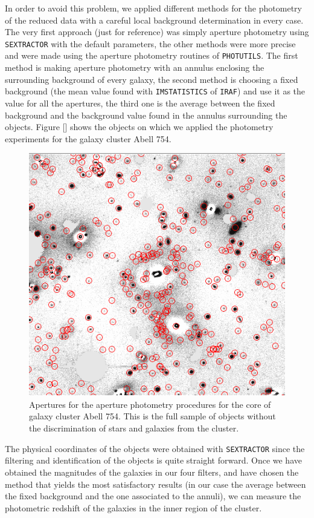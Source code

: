 In order to avoid this problem, we applied different methods for the photometry of the reduced data with a careful local background determination in every case. The very first approach (just for reference) was simply aperture photometry using \texttt{SEXTRACTOR} with the default parameters, the other methods were more precise and were made using the aperture photometry routines of \texttt{PHOTUTILS}. The first method is making aperture photometry with an annulus enclosing the surrounding background of every galaxy, the second method is choosing a fixed background (the mean value found with \texttt{IMSTATISTICS} of \texttt{IRAF}) and use it as the value for all the apertures, the third one is the average between the fixed background and the background value found in the annulus surrounding the objects. Figure [] shows the objects on which we applied the photometry experiments for the galaxy cluster Abell 754.

\begin{figure}[H]
\centering
\includegraphics[width=15cm]{images/aperture_photometry.png}
\caption[Apertures for the aperture photometry procedures]{Apertures for the aperture photometry procedures for the core of galaxy cluster Abell 754. This is the full sample of objects without the discrimination of stars and galaxies from the cluster.}
\end{figure}

The physical coordinates of the objects  were obtained with \texttt{SEXTRACTOR} since the filtering and identification of the objects is quite straight forward. Once we have obtained the magnitudes of the galaxies in our four filters, and have chosen the method that yields the most satisfactory results (in our case the average between the fixed background and the one associated to the annuli), we can measure the photometric redshift of the galaxies in the inner region of the cluster.

